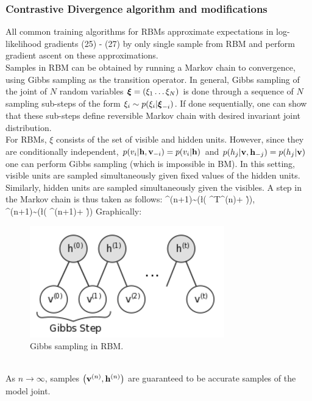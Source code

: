 \subsubsection{Contrastive Divergence algorithm and modifications}
All common training algorithms for RBMs approximate expectations in log-likelihood gradients (25) - (27) by only single sample from RBM and perform gradient ascent on these approximations. 
\\[1em]
Samples in RBM can be obtained by running a Markov chain to convergence, using Gibbs sampling as the transition operator. 
In general, Gibbs sampling of the joint of $N$ random variables $\boldsymbol{\xi}=(\xi_1\ldots\xi_N)$ is done through a sequence of $N$ sampling sub-steps of the form $\xi_i\sim p(\xi_i|\boldsymbol{\xi}_{-i})$. If done sequentially, one can show that these sub-steps define reversible Markov chain with desired invariant joint distribution.
\\[1em]
For RBMs, $\xi$ consists of the set of visible and hidden units. However, since they are conditionally independent, $p(v_i|\mathbf{h},\mathbf{v}_{-i})=p(v_i|\mathbf{h})$ and $p(h_j|\mathbf{v},\mathbf{h}_{-j})=p(h_j|\mathbf{v})$ one can perform  Gibbs sampling (which is impossible in BM). In this setting, visible units are sampled simultaneously given fixed values of the hidden units. Similarly, hidden units are sampled simultaneously given the visibles. A step in the Markov chain is thus taken as follows:
\bg
{}^{(n+1)}\;\sim\;(\l( ^T^{(n)}+ \r)),
\\
^{(n+1)}\;\sim\;(\l( ^{(n+1)}+ \r))
\eg
Graphically:
\begin{figure}[h]
\begin{mdframed}
\includegraphics[scale=0.6]{img/gibbs.png}
\centering
\caption{Gibbs sampling in RBM.}
\label{fig:gibbs}
\end{mdframed}
\end{figure}
\\
As $n \rightarrow \infty$, samples $\left(\mathbf{v}^{(n)},\mathbf{h}^{(n)}\right)$ are guaranteed to be accurate samples of the model joint.
